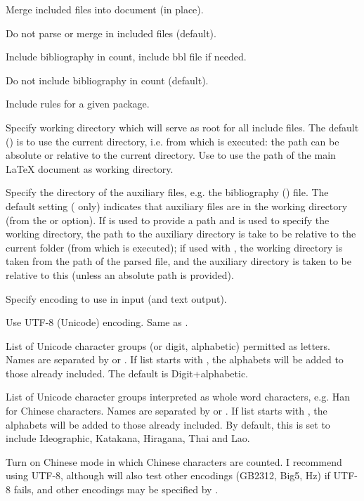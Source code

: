 \begin{description}
\option[-merge]Merge included files into document (in place).

\option[-noinc]Do not parse or merge in included files (default).

\option[-incbib]Include bibliography in count, include bbl file if needed.

\option[-nobib]Do not include bibliography in count (default).

\option[-incpackage=]Include rules for a given package.

\option[-dir\alt{=\ldots}]Specify working directory which will serve as root for all include files. The default () is to use the current directory, i.e. from which \TeXcount{} is executed: the path can be absolute or relative to the current directory. Use  to use the path of the main \LaTeX{} document as working directory.

\option[-auxdir\alt{=\ldots}]Specify the directory of the auxiliary files, e.g. the bibliography () file. The default setting ( only) indicates that auxiliary files are in the working directory (from the  or  option). If  is used to provide a path and  is used to specify the working directory, the path to the auxiliary directory is take to be relative to the current folder (from which \TeXcount{} is executed); if used with , the working directory is taken from the path of the parsed file, and the auxiliary directory is taken to be relative to this (unless an absolute path is provided).

\option[-enc=, -encoding=]Specify encoding to use in input (and text output).

Use UTF-8 (Unicode) encoding. Same as .

\option[-alpha=, -alphabets=]List of Unicode character groups (or digit, alphabetic) permitted as letters. Names are separated by \code{,} or \code{+}. If list starts with \code{+}, the alphabets will be added to those already included. The default is Digit+alphabetic.

\option[-logo=, -logograms=]List of Unicode character groups interpreted as whole word characters, e.g. Han for Chinese characters. Names are separated by \code{,} or \code{+}. If list starts with \code{+}, the alphabets will be added to those already included. By default, this is set to include Ideographic, Katakana, Hiragana, Thai and Lao.

Turn on Chinese mode in which Chinese characters are counted. I recommend using UTF-8, although \TeXcount{} will also test other encodings (GB2312, Big5, Hz) if UTF-8 fails, and other encodings may be specified by .


\end{description}
